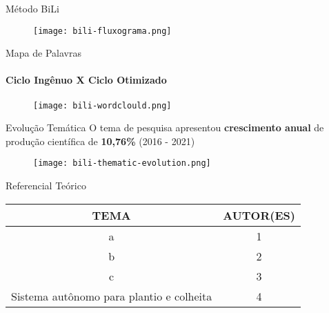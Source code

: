 \begin{frame}[c]{Método BiLi}
    \begin{figure}
        \centering
        \texttt{[image: bili-fluxograma.png]}
    \end{figure}
\end{frame}

\begin{frame}[c]{Mapa de Palavras}
    \framesubtitle{Ciclo Ingênuo X Ciclo Otimizado}
    \begin{figure}
        \centering
        \texttt{[image: bili-wordclould.png]}
    \end{figure}
\end{frame}

\begin{frame}[c]{Evolução Temática}
    O tema de pesquisa apresentou \textbf{crescimento anual} de produção científica de \textbf{10,76\%} (2016 - 2021)\\
    \begin{figure}
        \centering
        \texttt{[image: bili-thematic-evolution.png]}
    \end{figure}
\end{frame}

\begin{frame}[c]{Referencial Teórico}
    \begin{table}[]
        \begin{tabular}{cc}
        \hline
        TEMA & AUTOR(ES) \\ \hline
        a    & 1          \\ \hline
        b    & 2         \\ \hline
        c    & 3         \\ \hline
        Sistema autônomo para plantio e colheita   & 4        
        \end{tabular}
        \end{table}
\end{frame}
